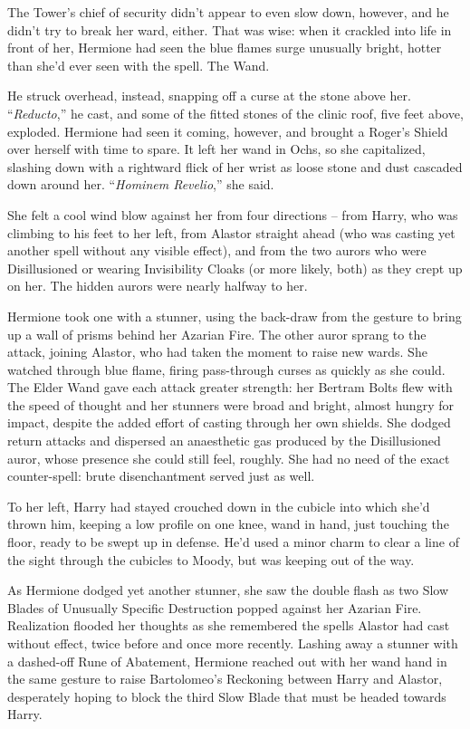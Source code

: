 The Tower's chief of security didn't appear to even slow down, however,
and he didn't try to break her ward, either. That was wise: when it
crackled into life in front of her, Hermione had seen the blue flames
surge unusually bright, hotter than she'd ever seen with the spell. The
Wand.

He struck overhead, instead, snapping off a curse at the stone above
her. ``\emph{Reducto},'' he cast, and some of the fitted stones of the
clinic roof, five feet above, exploded. Hermione had seen it coming,
however, and brought a Roger's Shield over herself with time to spare.
It left her wand in Ochs, so she capitalized, slashing down with a
rightward flick of her wrist as loose stone and dust cascaded down
around her. ``\emph{Hominem Revelio},'' she said.

She felt a cool wind blow against her from four directions -- from
Harry, who was climbing to his feet to her left, from Alastor straight
ahead (who was casting yet another spell without any visible effect),
and from the two aurors who were Disillusioned or wearing Invisibility
Cloaks (or more likely, both) as they crept up on her. The hidden aurors
were nearly halfway to her.

Hermione took one with a stunner, using the back-draw from the gesture
to bring up a wall of prisms behind her Azarian Fire. The other auror
sprang to the attack, joining Alastor, who had taken the moment to raise
new wards. She watched through blue flame, firing pass-through curses as
quickly as she could. The Elder Wand gave each attack greater strength:
her Bertram Bolts flew with the speed of thought and her stunners were
broad and bright, almost hungry for impact, despite the added effort of
casting through her own shields. She dodged return attacks and dispersed
an anaesthetic gas produced by the Disillusioned auror, whose presence
she could still feel, roughly. She had no need of the exact
counter-spell: brute disenchantment served just as well.

To her left, Harry had stayed crouched down in the cubicle into which
she'd thrown him, keeping a low profile on one knee, wand in hand, just
touching the floor, ready to be swept up in defense. He'd used a minor
charm to clear a line of the sight through the cubicles to Moody, but
was keeping out of the way.

As Hermione dodged yet another stunner, she saw the double flash as two
Slow Blades of Unusually Specific Destruction popped against her Azarian
Fire. Realization flooded her thoughts as she remembered the spells
Alastor had cast without effect, twice before and once more recently.
Lashing away a stunner with a dashed-off Rune of Abatement, Hermione
reached out with her wand hand in the same gesture to raise Bartolomeo's
Reckoning between Harry and Alastor, desperately hoping to block the
third Slow Blade that must be headed towards Harry.

